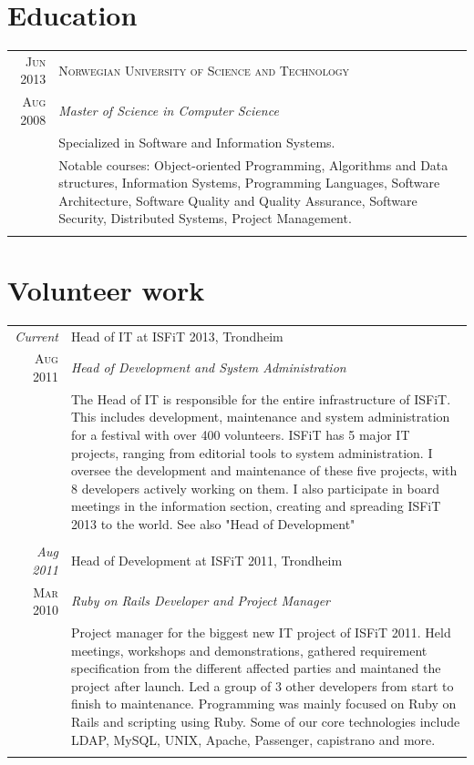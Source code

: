 \documentclass[a4paper,10pt]{article}
\begin{document}
\section{Education}
\begin{tabular}{r|p{12cm}}
  \textsc{Jun 2013} & \textsc{Norwegian University of Science and Technology} \\\textsc{Aug 2008}&\emph{Master of Science in Computer Science}\\&\footnotesize{Specialized in Software and Information Systems.} \\& \footnotesize{Notable courses: Object-oriented Programming, Algorithms and Data structures, Information Systems, Programming Languages, Software Architecture, Software Quality and Quality Assurance, Software Security, Distributed Systems, Project Management.}\\\multicolumn{2}{c}{} \\
\end{tabular}

\section{Volunteer work}
\begin{tabular}{r|p{12cm}}
  \emph{Current} & Head of IT at ISFiT 2013, Trondheim  \\\textsc{Aug 2011}&\emph{Head of Development and System Administration}\\&\footnotesize{The Head of IT is responsible for the entire infrastructure of ISFiT. This includes development, maintenance and system administration for a festival with over 400 volunteers. ISFiT has 5 major IT projects, ranging from editorial tools to system administration. I oversee the development and maintenance of these five projects, with 8 developers actively working on them. I also participate in board meetings in the information section, creating and spreading ISFiT 2013 to the world. See also "Head of Development"}\\\multicolumn{2}{c}{} \\
  \emph{Aug 2011} & Head of Development at ISFiT 2011, Trondheim  \\\textsc{Mar 2010}&\emph{Ruby on Rails Developer and Project Manager}\\&\footnotesize{Project manager for the biggest new IT project of ISFiT 2011. Held meetings, workshops and demonstrations, gathered requirement specification from the different affected parties and maintaned the project after launch. Led a group of 3 other developers from start to finish to maintenance. Programming was mainly focused on Ruby on Rails and scripting using Ruby. Some of our core technologies include LDAP, MySQL, UNIX, Apache, Passenger, capistrano and more.}\\\multicolumn{2}{c}{} \\
\end{tabular}
\end{document}
